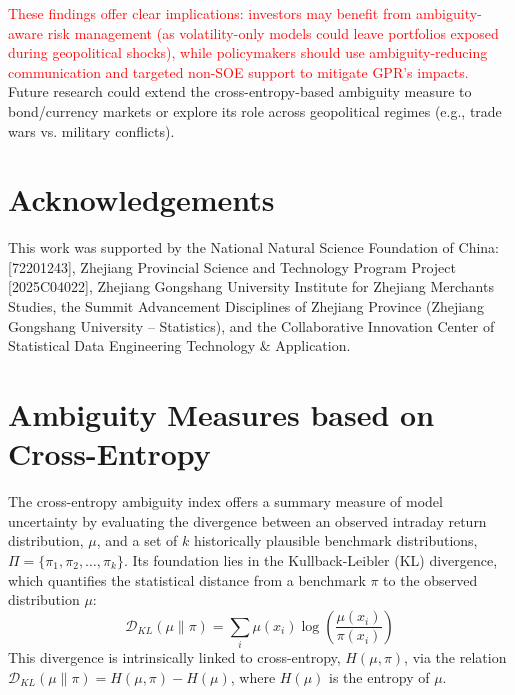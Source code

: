 \documentclass[preprint,12pt,authoryear]{elsarticle}
\begin{document}
\textcolor{red}{These findings offer clear implications: investors may benefit from ambiguity-aware risk management (as volatility-only models could leave portfolios exposed during geopolitical shocks), while policymakers should use ambiguity-reducing communication and targeted non-SOE support to mitigate GPR's impacts.} Future research could extend the cross-entropy-based ambiguity measure to bond/currency markets or explore its role across geopolitical regimes (e.g., trade wars vs. military conflicts).




\clearpage
\section*{Acknowledgements}
This work was supported by the National Natural Science Foundation of China: [72201243], Zhejiang Provincial Science and Technology Program Project [2025C04022], Zhejiang Gongshang University Institute for Zhejiang Merchants Studies, the Summit Advancement Disciplines of Zhejiang Province (Zhejiang Gongshang University -- Statistics), and the Collaborative Innovation Center of Statistical Data Engineering Technology \& Application.

\appendix

\section{Ambiguity Measures based on Cross-Entropy}
The cross-entropy ambiguity index offers a summary measure of model uncertainty by evaluating the divergence between an observed intraday return distribution, $\mu$, and a set of $k$ historically plausible benchmark distributions, $\Pi = \{\pi_1, \pi_2, \dots, \pi_k\}$. Its foundation lies in the Kullback-Leibler (KL) divergence, which quantifies the statistical distance from a benchmark $\pi$ to the observed distribution $\mu$:
\begin{equation}
    \mathcal{D}_{KL}(\mu \| \pi) = \sum_{i} \mu(x_i) \log\left(\frac{\mu(x_i)}{\pi(x_i)}\right)
\end{equation}
This divergence is intrinsically linked to cross-entropy, $H(\mu, \pi)$, via the relation $\mathcal{D}_{KL}(\mu \| \pi) = H(\mu, \pi) - H(\mu)$, where $H(\mu)$ is the entropy of $\mu$.
\end{document}
